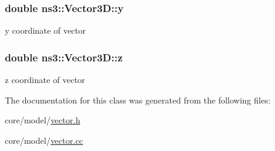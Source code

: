 \subsubsection[{\texorpdfstring{y}{y}}]{\setlength{\rightskip}{0pt plus 5cm}double ns3\+::\+Vector3\+D\+::y}\hypertarget{classns3_1_1Vector3D_ae679257823406b2e008be04316e4245f}{}\label{classns3_1_1Vector3D_ae679257823406b2e008be04316e4245f}
y coordinate of vector 
\subsubsection[{\texorpdfstring{z}{z}}]{\setlength{\rightskip}{0pt plus 5cm}double ns3\+::\+Vector3\+D\+::z}\hypertarget{classns3_1_1Vector3D_ac31aba8cd85d66f8cf52e4b4c313f415}{}\label{classns3_1_1Vector3D_ac31aba8cd85d66f8cf52e4b4c313f415}
z coordinate of vector 

The documentation for this class was generated from the following files\+:\begin{DoxyCompactItemize}
\item 
core/model/\hyperlink{vector_8h}{vector.\+h}\item 
core/model/\hyperlink{vector_8cc}{vector.\+cc}\end{DoxyCompactItemize}
